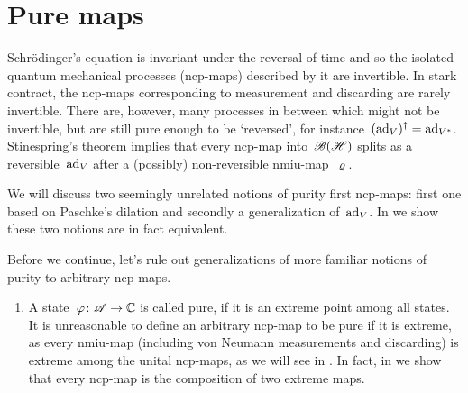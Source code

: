 \documentclass[b]{subfiles}
\begin{document}
\section{Pure maps}
\begin{parsec}%
\begin{point}%
Schr\"odinger's equation is invariant under the reversal of time
    and so the isolated quantum mechanical processes (ncp-maps) described by
    it are invertible.
In stark contract, the ncp-maps corresponding to measurement and discarding
    are rarely invertible.
There are, however, many  processes in between
    which might not be invertible, but are still pure enough to be `reversed',
    for instance~$(\mathrm{ad}_V)^\dagger = \mathrm{ad}_{V^*}$.
Stinespring's theorem implies that every ncp-map into~$\mathscr{B}(\mathscr{H})$
    splits as a reversible~$\mathrm{ad}_V$ after a (possibly) non-reversible
    nmiu-map~$\varrho$.
\begin{point}%
We will discuss two seemingly unrelated notions of purity first ncp-maps:
    first one based on Paschke's dilation
    and secondly a generalization of~$\mathrm{ad}_V$.
In \TODO{} we show these two notions are in fact equivalent.
\end{point}
\begin{point}%
Before we continue, let's rule out generalizations
    of more familiar notions of purity
    to arbitrary ncp-maps.
\begin{enumerate}
\item
A state~$\varphi\colon \mathscr{A} \to \mathbb{C}$ is called pure, if it is an extreme
    point among all states.
It is unreasonable to define an arbitrary ncp-map to be pure
    if it is extreme, as every nmiu-map (including 
    von Neumann measurements and discarding)
    is extreme among the unital ncp-maps,
    as we will see in .
In fact, in 
    we show that every ncp-map is the composition
    of two extreme maps.


\end{enumerate}
\end{point}
\end{point}
\end{parsec}
\end{document}
